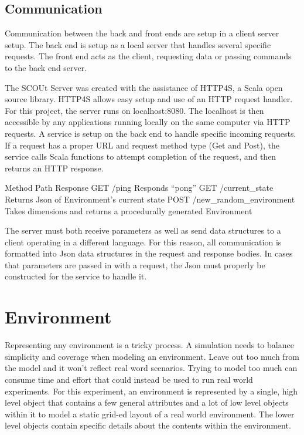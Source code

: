 \subsection{Communication}
Communication between the back and front ends are setup in a client server setup.
The back end is setup as a local server that handles several specific requests.
The front end acts as the client, requesting data or passing commands to the back end server.

The SCOUt Server was created with the assistance of HTTP4S, a Scala open source library. 
HTTP4S allows easy setup and use of an HTTP request handler.
For this project, the server runs on localhost:8080.
The localhost is then accessible by any applications running locally on the same computer via HTTP requests.
A service is setup on the back end to handle specific incoming requests.
If a request has a proper URL and request method type (Get and Post), the service calls Scala functions to attempt completion of the request, and then returns an HTTP response.

Method	Path	Response
GET	/ping	Responds “pong”
GET	/current_state	Returns Json of Environment’s current state
POST	/new_random_environment	Takes dimensions and returns a procedurally generated Environment

The server must both receive parameters as well as send data structures to a client operating in a different language.
For this reason, all communication is formatted into Json data structures in the request and response bodies.
In cases that parameters are passed in with a request, the Json must properly be constructed for the service to handle it.



\section{Environment}
Representing any environment is a tricky process.
A simulation needs to balance simplicity and coverage when modeling an environment.
Leave out too much from the model and it won’t reflect real word scenarios.
Trying to model too much can consume time and effort that could instead be used to run real world experiments.
For this experiment, an environment is represented by a single, high level object that contains a few general attributes and a lot of low level objects within it to model a static grid-ed layout of a real world environment.
The lower level objects contain specific details about the contents within the environment.

